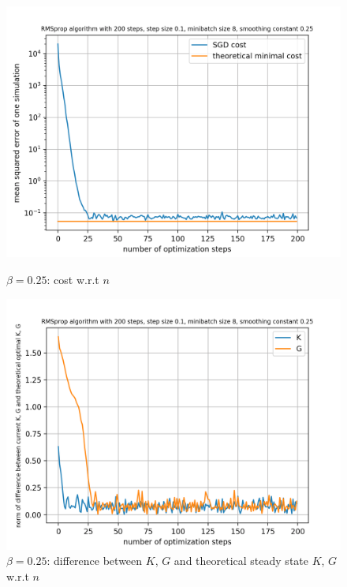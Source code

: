 \documentclass{article}
\begin{document}
\begin{figure}[h!]
	\centering
	\begin{minipage}[t]{.28\paperwidth}
		\centering
		\includegraphics[width=1.0\textwidth]{Figures/beta_0_25.png}
		\caption{$\beta = 0.25$: cost w.r.t $n$}
	\end{minipage}%
	\begin{minipage}[t]{.28\paperwidth}
		\centering
		\includegraphics[width=1.0\textwidth]{Figures/d_beta_0_25.png}
		\caption{$\beta = 0.25$: difference between $K$, $G$ and theoretical steady state $K$, $G$ w.r.t $n$}
	\end{minipage}%
	\begin{minipage}[t]{.28\paperwidth}
		\centering

\end{minipage}
\end{figure}
\end{document}

